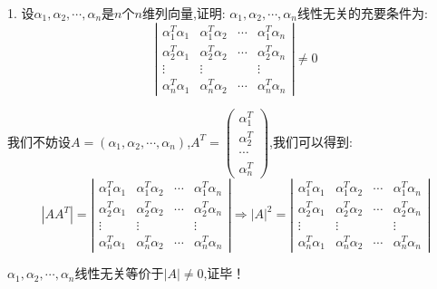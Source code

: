 1. 设$\alpha_{1},\alpha_{2},\cdots,\alpha_{n}$是$n$个$n$维列向量,证明: $\alpha_{1},\alpha_{2},\cdots,\alpha_{n}$线性无关的充要条件为: $$\left| \begin{matrix}
	\alpha_{1}^{T}\alpha_{1}&\alpha_{1}^{T}\alpha_{2}&\cdots&\alpha_{1}^{T}\alpha_{n}\\\alpha_{2}^{T}\alpha_{1}&\alpha_{2}^{T}\alpha_{2}&\cdots&\alpha_{2}^{T}\alpha_{n}\\\vdots&\vdots& &\vdots\\\alpha_{n}^{T}\alpha_{1}&\alpha_{n}^{T}\alpha_{2}&\cdots&\alpha_{n}^{T}\alpha_{n}
\end{matrix}\right|\neq 0$$
\begin{solution}
	
	我们不妨设$A=(\alpha_{1},\alpha_{2},\cdots,\alpha_{n})$,$A^{T}=\left( \begin{matrix}
		\alpha_{1}^{T}\\\alpha_{2}^{T}\\\cdots\\\alpha_{n}^{T}
	\end{matrix}\right) $,我们可以得到: 
	$$|AA^{T}|=\left| \begin{matrix}
		\alpha_{1}^{T}\alpha_{1}&\alpha_{1}^{T}\alpha_{2}&\cdots&\alpha_{1}^{T}\alpha_{n}\\\alpha_{2}^{T}\alpha_{1}&\alpha_{2}^{T}\alpha_{2}&\cdots&\alpha_{2}^{T}\alpha_{n}\\\vdots&\vdots& &\vdots\\\alpha_{n}^{T}\alpha_{1}&\alpha_{n}^{T}\alpha_{2}&\cdots&\alpha_{n}^{T}\alpha_{n}
	\end{matrix}\right|\Rightarrow |A|^2=\left| \begin{matrix}
		\alpha_{1}^{T}\alpha_{1}&\alpha_{1}^{T}\alpha_{2}&\cdots&\alpha_{1}^{T}\alpha_{n}\\\alpha_{2}^{T}\alpha_{1}&\alpha_{2}^{T}\alpha_{2}&\cdots&\alpha_{2}^{T}\alpha_{n}\\\vdots&\vdots& &\vdots\\\alpha_{n}^{T}\alpha_{1}&\alpha_{n}^{T}\alpha_{2}&\cdots&\alpha_{n}^{T}\alpha_{n}
	\end{matrix}\right|$$
	
	$\alpha_{1},\alpha_{2},\cdots,\alpha_{n}$线性无关等价于$|A|\neq 0$,证毕！
\end{solution}

